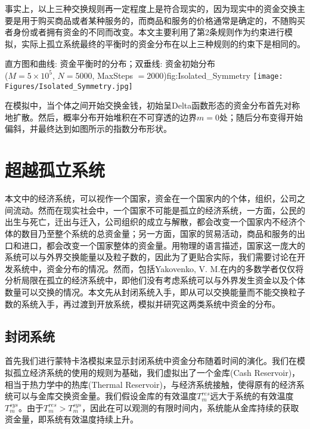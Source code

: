 \documentclass[tsinghuacite]{HustGraduPaper}
\begin{document}
		事实上，以上三种交换规则再一定程度上是符合现实的，因为现实中的资金交换主要是用于购买商品或者某种服务的，而商品和服务的价格通常是确定的，不随购买者身份或者拥有资金的不同而改变。本文主要利用了第2条规则作为约束进行模拟，实际上孤立系统最终的平衡时的资金分布在以上三种规则的约束下是相同的\cite{dragulescu2000statistical}。
		
			\vspace{1.5em} 
			
			\begin{generalfig}[htb]{直方图和曲线: 资金平衡时的分布；双垂线: 资金初始分布 \\ ($M = 5 \times 10^5$, $N = 5000$, MaxSteps $= 2000$)}{fig:Isolated_Symmetry}
				\texttt{[image: Figures/Isolated\_Symmetry.jpg]}
			\end{generalfig}
			
			\vspace{1.5em}  
		
		
		在模拟中，当个体之间开始交换金钱，初始呈Delta函数形态的资金分布首先对称地扩散。然后，概率分布开始堆积在不可穿透的边界$m = 0$处；随后分布变得开始偏斜，并最终达到如图所示的指数分布形状。
		
	
		\section{超越孤立系统}\label{sec:beyond_isolated}
	
		本文中的经济系统，可以视作一个国家，资金在一个国家内的个体，组织，公司之间流动。然而在现实社会中，一个国家不可能是孤立的经济系统，一方面，公民的出生与死亡，迁出与迁入，公司组织的成立与解散，都会改变一个国家内不经济个体的数目乃至整个系统的总资金量；另一方面，国家的贸易活动，商品和服务的出口和进口，都会改变一个国家整体的资金量。用物理的语言描述，国家这一庞大的系统可以与外界交换能量以及粒子数的，因此为了更贴合实际，我们需要讨论在开发系统中，资金分布的情况。然而，包括Yakovenko, V. M.在内的多数学者\cite{dragulescu2000statistical}\cite{ausloos2007model}\cite{chatterjee2006kinetic}仅仅将分析局限在孤立的经济系统中，即他们没有考虑系统可以与外界发生资金以及个体数量可以交换的情况。本文先从封闭系统入手，即从可以交换能量而不能交换粒子数的系统入手，再过渡到开放系统，模拟并研究这两类系统中资金的分布。

	
	
			\subsection{封闭系统}
	
			首先我们进行蒙特卡洛模拟来显示封闭系统中资金分布随着时间的演化。我们在模拟孤立经济系统的使用的规则为基础，我们虚拟出了一个金库(Cash Reservoir)，相当于热力学中的热库(Thermal Reservoir)，与经济系统接触，使得原有的经济系统可以与金库交换资金量。我们假设金库的有效温度$T_m^{res}$远大于系统的有效温度$T_m^{sys}$。由于$T_m^{res} > T_m^{sys}$，因此在可以观测的有限时间内，系统能从金库持续的获取资金量，即系统有效温度持续上升。
						
\end{document}
